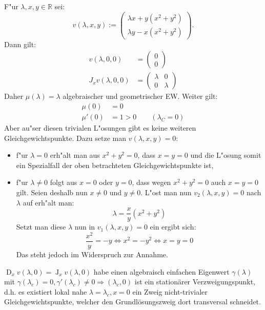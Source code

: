 \documentclass[a4paper, 13pt]{scrreprt}
\theoremstyle{definition} \newtheorem{definition}{Definition}[section]
\newenvironment{beispiel}[1][Beispiel]{\begin{trivlist}
\item[\hskip \labelsep {\bfseries #1}]}{\end{trivlist}}
\newcommand{\RR}{\mathbb{R}}
\begin{document}
\begin{beispiel}
F"ur $\lambda,x,y\in\RR$ sei:
\[
v(\lambda,x,y):=\begin{pmatrix}
\lambda x + y(x^2+y^2)\\
\lambda y - x(x^2+y^2)
\end{pmatrix}.
\]
Dann gilt:
\begin{align*}
v(\lambda,0,0) &= \begin{pmatrix}
0\\
0
\end{pmatrix}\\
J_xv(\lambda,0,0) &= \left(\begin{array}{cc}
\lambda & 0\\
0 & \lambda
\end{array}\right)
\end{align*}
Daher $\mu(\lambda) = \lambda$ algebraischer und geometrischer EW. Weiter gilt:
\begin{align*}
\mu(0) &= 0\\
\mu'(0) &= 1 > 0\qquad (\lambda_C = 0)
\end{align*}
Aber au"ser diesen trivialen L"osungen gibt es keine weiteren Gleichgewichtspunkte. Dazu setze man $v(\lambda,x,y) = 0$:
\begin{itemize}
\item
f"ur $\lambda = 0$ erh"alt man aus $x^2+y^2 = 0$, dass $x = y = 0$ und die L"osung somit ein Spezialfall der oben betrachteten Gleichgewichtspunkte ist,

\item
f"ur $\lambda\neq 0$ folgt aus $x = 0$ oder $y = 0$, dass wegen $x^2+y^2 = 0$ auch $x = y = 0$ gilt. Seien deshalb nun $x\neq 0$ und $y\neq 0$. L"ost man nun $v_2(\lambda,x,y)=0$ nach $\lambda$ auf erh"alt man:
\[\lambda = \frac{x}{y}(x^2+y^2)\]
Setzt man diese $\lambda$ nun in $v_1(\lambda,x,y)=0$ ein ergibt sich:
\[
\frac{x^2}{y} = -y \Leftrightarrow x^2 = -y^2 \Leftrightarrow x = y = 0
\]
Das steht jedoch im Widerspruch zur Annahme.
\end{itemize}
\end{beispiel}


$\operatorname{D}_x v(\lambda ,0)=\operatorname{J}_x v(\lambda ,0)$ habe einen algebraisch einfachen Eigenwert $\gamma (\lambda)$ mit $\gamma(\lambda_c)=0, \gamma '(\lambda_c)\neq 0 \Rightarrow (\lambda_c,0)$ ist ein stationärer Verzweigungspunkt, d.h. es existiert lokal nahe $\lambda=\lambda_c, x=0$ ein Zweig nicht-trivialer Gleichgewichtspunkte, welcher den Grundlösungszweig dort transversal schneidet.
\end{document}
